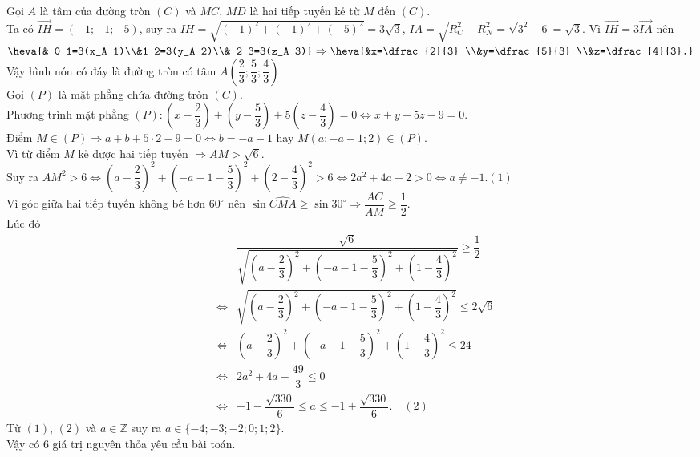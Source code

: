 \begin{bt}
{\begin{center}
		\end{center}
		Gọi $A$ là tâm của  đường tròn $(C)$ và $MC$, $MD$ là hai tiếp tuyến kẻ từ $M$ đến $(C)$.\\
		Ta  có $\overrightarrow{IH}=(-1;-1;-5)$, suy ra $IH=\sqrt{(-1)^2+(-1)^2+(-5)^2}=3\sqrt{3}$, $IA=\sqrt{R_C^2-R_N^2}=\sqrt{3^2-6}=\sqrt{3}$.
		Vì $\overrightarrow{IH}=3\overrightarrow{IA}$ nên $\heva{& 0-1=3(x_A-1)\\&1-2=3(y_A-2)\\&-2-3=3(z_A-3)}\Rightarrow \heva{&x=\dfrac{2}{3} \\&y=\dfrac{5}{3} \\&z=\dfrac{4}{3}.}$\\ 
		Vậy hình nón có đáy  là đường tròn có tâm $A\left(\dfrac{2}{3};\dfrac{5}{3};\dfrac{4}{3}\right)$.\\
		 Gọi $(P)$ là mặt phẳng chứa đường tròn $(C)$.\\
		Phương trình mặt phẳng  $(P)\colon \left(x-\dfrac{2}{3}\right)+\left(y-\dfrac{5}{3}\right)+5\left(z-\dfrac{4}{3}\right)=0 \Leftrightarrow x+y+5 z-9=0$.\\
		Điểm $M \in (P) \Rightarrow a+b+5\cdot  2-9=0 \Leftrightarrow b=-a-1$ hay $M(a;-a-1;2) \in (P)$.\\
		Vì từ điểm  $M$ kẻ được hai tiếp tuyến $\Rightarrow AM>\sqrt{6}$.\\
		 Suy ra $
		A M^2>6\Leftrightarrow \left(a-\dfrac{2}{3}\right)^2+\left(-a-1-\dfrac{5}{3}\right)^2+\left(2-\dfrac{4}{3}\right)^2>6\Leftrightarrow  2a^2+4 a+2>0 \Leftrightarrow a \neq-1$.\quad$(1)$\\
		Vì góc giữa  hai tiếp tuyến không bé hơn $60^{\circ}$ nên
		$\sin \widehat{CMA}\geq \sin 30^{\circ} \Rightarrow \dfrac{A C}{A M} \geq \dfrac{1}{2}$.\\ 
		 Lúc đó
		\begin{eqnarray*}
			&&\dfrac{\sqrt{6}}{\sqrt{\left(a-\dfrac{2}{3}\right)^2+\left(-a-1-\dfrac{5}{3}\right)^2+\left(1-\dfrac{4}{3}\right)^2}}  \geq \dfrac{1}{2}\\
			&  \Leftrightarrow& \sqrt{\left(a-\dfrac{2}{3}\right)^2+\left(-a-1-\dfrac{5}{3}\right)^2+\left(1-\dfrac{4}{3}\right)^2} \leq 2 \sqrt{6} \\
			 & \Leftrightarrow&\left(a-\dfrac{2}{3}\right)^2+\left(-a-1-\dfrac{5}{3}\right)^2+\left(1-\dfrac{4}{3}\right)^2 \leq 24 \\
			 & \Leftrightarrow &2a^2+4 a-\dfrac{49}{3} \leq 0 \\
			& \Leftrightarrow&-1-\dfrac{\sqrt{330}}{6} \leq a  \leq-1+\dfrac{\sqrt{330}}{6}.\quad(2)
		\end{eqnarray*}
		Từ $(1)$, $(2)$ và $a \in \mathbb{Z}$ suy ra $a \in\{-4;-3;-2; 0; 1;  2\}$.\\
		Vậy có $6$ giá trị nguyên thỏa  yêu cầu bài toán.
	} 
\end{bt}

